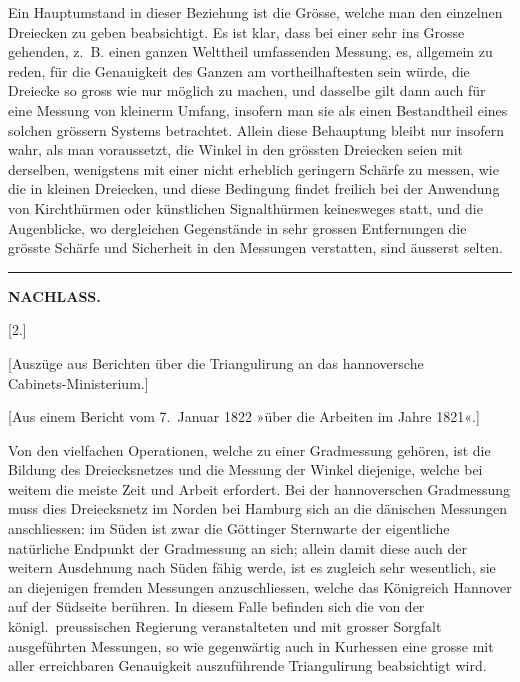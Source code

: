 \par\noindent\hspace*{\parindent}Ein Hauptumstand in dieser Beziehung ist die Grösse, welche man den
einzelnen Dreiecken zu geben beabsichtigt. Es ist klar, dass bei einer sehr
ins Grosse gehenden, z.~B. einen ganzen Welttheil umfassenden Messung, es,
allgemein zu reden, für die Genauigkeit des Ganzen am vortheilhaftesten sein
würde, die Dreiecke so gross wie nur möglich zu machen, und dasselbe gilt
dann auch für eine Messung von kleinerm Umfang, insofern man sie als einen
Bestandtheil eines solchen grössern Systems betrachtet. Allein diese Behauptung
bleibt nur insofern wahr, als man voraussetzt, die Winkel in den
grössten Dreiecken seien mit derselben, wenigstens mit einer nicht erheblich
geringern Schärfe zu messen, wie die in kleinen Dreiecken, und diese Bedingung
findet freilich bei der Anwendung von Kirchthürmen oder künstlichen
Signalthürmen keinesweges statt, und die Augenblicke, wo dergleichen Gegenstände
in sehr grossen Entfernungen die grösste Schärfe und Sicherheit in den
Messungen verstatten, sind äusserst selten.

\begin{center}
\rule{.24\linewidth}{.4pt}
\end{center}
\clearpage

\noindent{}\hfill{\small\textbf{NACHLASS.}}\hfill\null\par
\vspace{2\baselineskip}
\begin{center}
[2.]\par\smallskip
{\large [Auszüge aus Berichten über die Triangulirung an das hannoversche\\
Cabinets-Ministerium.]}
\end{center}
\bigskip
\begin{center}
[Aus einem Bericht vom 7.~Januar 1822 »über die Arbeiten im Jahre 1821«.]
\end{center}

\par\noindent\hspace*{\parindent}Von den vielfachen Operationen, welche zu einer Gradmessung gehören,
ist die Bildung des Dreiecksnetzes und die Messung der Winkel diejenige,
welche bei weitem die meiste Zeit und Arbeit erfordert. Bei der hannoverschen
Gradmessung muss dies Dreiecksnetz im Norden bei Hamburg sich an
die dänischen Messungen anschliessen: im Süden ist zwar die Göttinger Sternwarte
der eigentliche natürliche Endpunkt der Gradmessung an sich; allein
damit diese auch der weitern Ausdehnung nach Süden fähig werde, ist es zugleich
sehr wesentlich, sie an diejenigen fremden Messungen anzuschliessen,
welche das Königreich Hannover auf der Südseite berühren. In diesem Falle
befinden sich die von der königl.\ preussischen Regierung veranstalteten und
mit grosser Sorgfalt ausgeführten Messungen, so wie gegenwärtig auch in Kurhessen
eine grosse mit aller erreichbaren Genauigkeit auszuführende Triangulirung
beabsichtigt wird.

